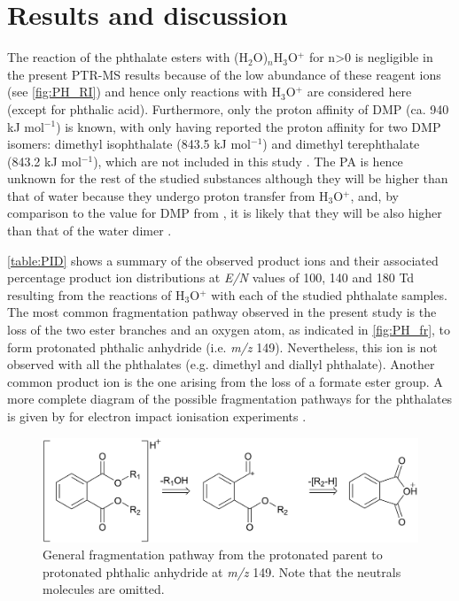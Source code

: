 




\section{Results and discussion}

The reaction of the phthalate esters with (H$_2$O)$_n$H$_3$O$^+$ for n>0 is negligible in the present PTR-MS results because of the low abundance of these reagent ions (see \autoref{fig:PH_RI}) and hence only reactions with H$_3$O$^+$ are considered here (except for phthalic acid).
%
Furthermore, only the proton affinity of DMP (ca. 940 kJ mol$^{-1}$) %
is known, with \citeauthor{doi:10.1063/1.556018}  only having reported the proton affinity for two DMP isomers: dimethyl isophthalate (843.5 kJ mol$^{-1}$) and dimethyl terephthalate (843.2 kJ mol$^{-1}$), which are not included in this study \cite{michalczuk2019isomer,doi:10.1063/1.556018}.
%
The PA is hence unknown for the rest of the studied substances although they will  be higher than that of water because they undergo proton transfer from H$_3$O$^+$, and, by comparison  to the value for DMP from \citeauthor{michalczuk2019isomer}, it is likely that they will be also higher than that of the water dimer \cite{michalczuk2019isomer}.


 
 \autoref{table:PID} shows a summary of the observed product ions and their associated percentage product ion distributions at \textit{E/N} values of 100, 140 and 180 Td resulting from the reactions of H$_3$O$^+$ with each of the studied phthalate samples. 
%
The most common fragmentation pathway observed in the present study is the loss of the two %
ester branches and an oxygen atom, %
as indicated in \autoref{fig:PH_fr}, to form protonated phthalic anhydride (i.e. \textit{m/z} 149).
%
Nevertheless, this ion is not observed with all the phthalates (e.g. dimethyl and diallyl phthalate). %
%
Another common product ion is the one arising from the loss of a formate ester group.
%
A more complete diagram of the possible fragmentation pathways for the phthalates is  given by \citeauthor{yin2014mass} for electron impact ionisation experiments \cite{yin2014mass}.
%
\begin{figure}[htb]%
\centering
\includegraphics[height=0.12\textheight]{pics/PH/frag.png}
\caption{General fragmentation pathway from the protonated parent to  protonated phthalic anhydride at \textit{m/z} 149. Note that the neutrals molecules are omitted.}
\label{fig:PH_fr}
\end{figure}

